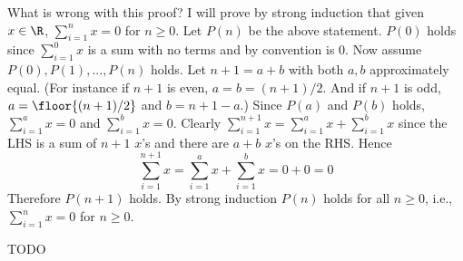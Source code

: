 \begin{ex}
What is wrong with this proof?
I will prove by strong induction that given $x \in \R$,
$\sum_{i = 1}^n x = 0$ for $n \geq 0$.
Let $P(n)$ be the above statement.
$P(0)$ holds since $\sum_{i = 1}^0 x$ is a sum with no terms and by
convention is $0$.
Now assume $P(0), P(1), ..., P(n)$ holds.
Let $n + 1 = a + b$ with both $a,b$ approximately equal.
(For instance if $n + 1$ is even, $a = b = (n + 1)/2$.
And if $n + 1$ is odd, $a = \floor{(n + 1)/2}$ and $b = n + 1 - a$.)
Since $P(a)$ and $P(b)$ holds, 
$\sum_{i = 1}^a x = 0$
and
$\sum_{i = 1}^b x = 0$.
Clearly
$\sum_{i = 1}^{n + 1} x = \sum_{i = 1}^{a} x + \sum_{i = 1}^{b} x$
since the LHS is a sum of $n + 1$ $x$'s and there are
$a + b$ $x$'s on the RHS.
Hence
\[
\sum_{i = 1}^{n + 1} x = \sum_{i = 1}^{a} x + \sum_{i = 1}^{b} x = 0 + 0 = 0
\]
Therefore $P(n + 1)$ holds.
By strong induction $P(n)$ holds for all $n \geq 0$, i.e.,
$\sum_{i = 1}^n x = 0$ for $n \geq 0$.
\end{ex}
TODO
